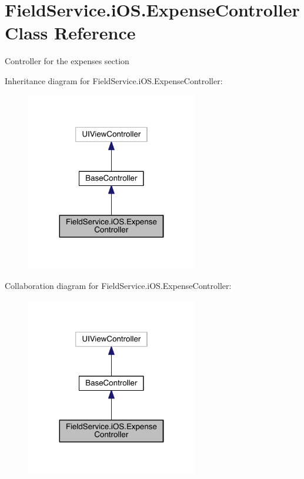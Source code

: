 \hypertarget{class_field_service_1_1i_o_s_1_1_expense_controller}{\section{Field\+Service.\+i\+O\+S.\+Expense\+Controller Class Reference}
\label{class_field_service_1_1i_o_s_1_1_expense_controller}
}


Controller for the expenses section  




Inheritance diagram for Field\+Service.\+i\+O\+S.\+Expense\+Controller\+:
\nopagebreak
\begin{figure}[H]
\begin{center}
\leavevmode
\includegraphics[width=212pt]{class_field_service_1_1i_o_s_1_1_expense_controller__inherit__graph}
\end{center}
\end{figure}


Collaboration diagram for Field\+Service.\+i\+O\+S.\+Expense\+Controller\+:
\nopagebreak
\begin{figure}[H]
\begin{center}
\leavevmode
\includegraphics[width=212pt]{class_field_service_1_1i_o_s_1_1_expense_controller__coll__graph}
\end{center}
\end{figure}
